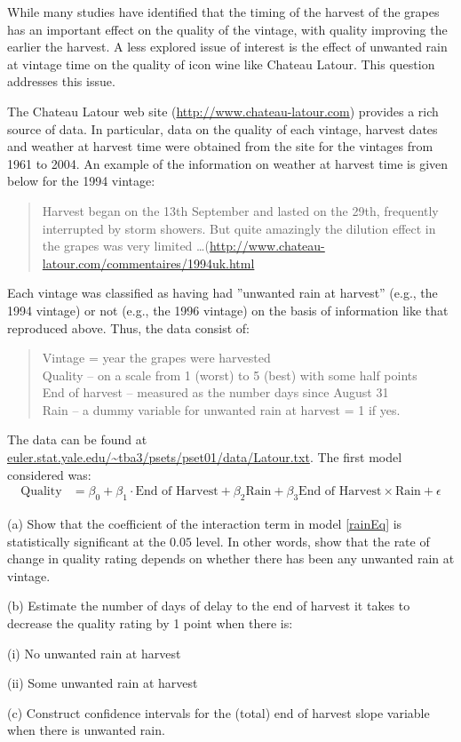 \documentclass[12pt]{article}
\begin{document}
While many studies have identified that the timing of the harvest of the grapes has an important effect on the quality of the vintage, with quality improving the earlier the harvest. A less explored issue of interest is the effect of unwanted rain at vintage time on the quality of icon wine like Chateau Latour. This question addresses this issue.

The Chateau Latour web site (\url{http://www.chateau-latour.com}) provides a rich source of data. In particular, data on the quality of each vintage, harvest dates and weather at harvest time were obtained from the site for the vintages from 1961 to 2004. An example of the information on weather at harvest time is given below for the 1994 vintage:
\begin{quote}
Harvest began on the 13th September and lasted on the 29th, frequently interrupted by storm showers. But quite amazingly the dilution effect in the grapes was very limited \ldots (\url{http://www.chateau-latour.com/commentaires/1994uk.html}
\end{quote}
Each vintage was classified as having had ''unwanted rain at harvest'' (e.g., the 1994 vintage) or not (e.g., the 1996 vintage) on the basis of information like that reproduced above. Thus, the data consist of:
\begin{quote}
Vintage = year the grapes were harvested \\
Quality – on a scale from 1 (worst) to 5 (best) with some half points \\
End of harvest – measured as the number days since August 31 \\
Rain – a dummy variable for unwanted rain at harvest = 1 if yes.
\end{quote}
The data can be found at \url{euler.stat.yale.edu/~tba3/psets/pset01/data/Latour.txt}. The first model considered was:
\begin{align}
\text{Quality} &= \beta_0 +\beta_1 \cdot \text{End of Harvest} + \beta_2 \text{Rain}
  + \beta_3 \text{End of Harvest} \times \text{Rain} + \epsilon \label{rainEq}
\end{align}

(a) Show that the coefficient of the interaction term in model \ref{rainEq} is statistically significant at the $0.05$ level. In other words, show that the rate of change in quality rating depends on whether there has been any unwanted rain at vintage.

(b) Estimate the number of days of delay to the end of harvest it takes to decrease the quality rating by 1 point when there is:

\quad (i) No unwanted rain at harvest

\quad (ii) Some unwanted rain at harvest

(c) Construct confidence intervals for the (total) end of harvest slope variable when there is unwanted rain.
\end{document}
